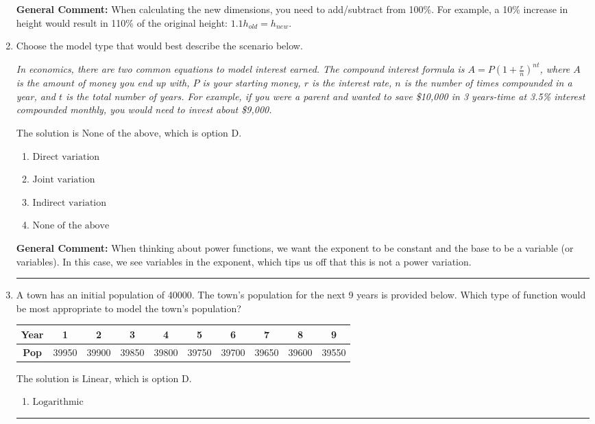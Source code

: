 \documentclass{extbook}[14pt]
\newcommand{\litem}[1]{\item #1

\rule{\textwidth}{0.4pt}}
\begin{document}
\begin{enumerate}
{\textbf{General Comment:} When calculating the new dimensions, you need to add/subtract from 100\%. For example, a 10\% increase in height would result in 110\% of the original height: $1.1h_{old} = h_{new}$.
}
\litem{
Choose the model type that would best describe the scenario below.

\begin{center}
    \textit{ In economics, there are two common equations to model interest earned. The compound interest formula is $A = P (1 + \frac{r}{n})^{nt}$, where $A$ is the amount of money you end up with, $P$ is your starting money, $r$ is the interest rate, $n$ is the number of times compounded in a year, and $t$ is the total number of years. For example, if you were a parent and wanted to save \$10,000 in 3 years-time at 3.5\% interest compounded monthly, you would need to invest about \$9,000. }
\end{center}
The solution is \( \text{None of the above} \), which is option D.\begin{enumerate}[label=\Alph*.]
\item \( \text{Direct variation} \)


\item \( \text{Joint variation} \)


\item \( \text{Indirect variation} \)


\item \( \text{None of the above} \)


\end{enumerate}

\textbf{General Comment:} When thinking about power functions, we want the exponent to be constant and the base to be a variable (or variables). In this case, we see variables in the exponent, which tips us off that this is not a power variation.
}
\litem{
A town has an initial population of 40000. The town's population for the next 9 years is provided below. Which type of function would be most appropriate to model the town's population?


\begin{tabular}{c|c|c|c|c|c|c|c|c|c}
\textbf{Year} &1 &2 &3 &4 &5 &6 &7 &8 &9\tabularnewline \hline
\textbf{Pop} &39950 &39900 &39850 &39800 &39750 &39700 &39650 &39600 &39550\end{tabular}The solution is \( \text{Linear} \), which is option D.\begin{enumerate}[label=\Alph*.]
\item \( \text{Logarithmic} \)


\end{enumerate}}
\end{enumerate}
\end{document}
